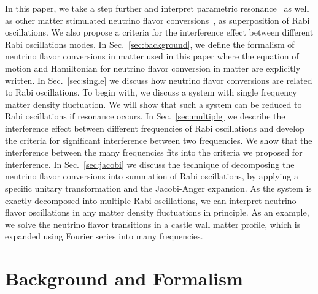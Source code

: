 \documentclass[%
reprint,
 amsmath,amssymb,
 prd,
]{revtex4-1}
\begin{document}
In this paper, we take a step further and interpret parametric resonance~\cite{Akhmedov2000, Krastev1989} as well as other matter stimulated neutrino flavor conversions~\cite{Kneller2013, Patton2014}, as superposition of Rabi oscillations. We also propose a criteria for the interference effect between different Rabi oscillations modes. In Sec.~\ref{sec:background}, we define the formalism of neutrino flavor conversions in matter used in this paper where the equation of motion and Hamiltonian for neutrino flavor conversion in matter are explicitly written. In Sec.~\ref{sec:single} we discuss how neutrino flavor conversions are related to Rabi oscillations. To begin with, we discuss a system with single frequency matter density fluctuation. We will show that such a system can be reduced to Rabi oscillations if resonance occurs. In Sec.~\ref{sec:multiple} we describe the interference effect between different frequencies of Rabi oscillations and develop the criteria for significant interference between two frequencies. We show that the interference between the many frequencies fits into the criteria we proposed for interference. In Sec.~\ref{sec:jacobi} we discuss the technique of decomposing the neutrino flavor conversions into summation of Rabi oscillations, by applying a specific unitary transformation and the Jacobi-Anger expansion. As the system is exactly decomposed into multiple Rabi oscillations, we can interpret neutrino flavor oscillations in any matter density fluctuations in principle. As an example, we solve the neutrino flavor transitions in a castle wall matter profile, which is expanded using Fourier series into many frequencies.



\section{\label{sec:background}Background and Formalism}

\end{document}
